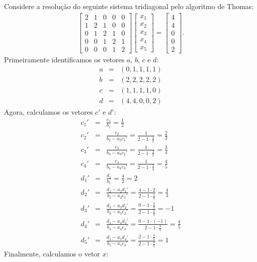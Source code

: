 \begin{ex}\label{linsis:exemplo5_5}
Considere a resolução do seguinte sistema tridiagonal pelo algoritmo de Thomas:
 \begin{eqnarray}\label{linsis:Exemplo5_5} \begin{bmatrix}
   { 2 } & { 1 } & { 0 } & { 0 } & { 0 } \\
   { 1 } & { 2 } & { 1 } & { 0 } & { 0 } \\
   { 0 } & { 1 } & { 2 } & { 1 } & { 0 } \\
   { 0 } & { 0 } & { 1 } & { 2 } & { 1 } \\
   { 0 } & { 0 } & { 0 } & { 1 } & { 2 }
 \end{bmatrix}
\begin{bmatrix}
   {x_1 }  \\
   {x_2 }  \\
   {x_3 }  \\
   {x_4 }  \\
   {x_5 }
\end{bmatrix}
=
\begin{bmatrix}
   {4}  \\
   {4 }  \\
   {0}  \\
   {0}\\
   {2 }
\end{bmatrix}
.
\end{eqnarray}
Primeiramente identificamos os vetores $a$, $b$, $c$ e $d$:
\begin{eqnarray*}
 a &=& (0, 1, 1, 1, 1)\\
 b &=& (2, 2, 2, 2, 2)\\
 c &=& (1, 1, 1, 1, 0)\\
 d &=& (4, 4, 0, 0, 2)
\end{eqnarray*}
Agora, calculamos os vetores $c'$ e $d'$:
\begin{eqnarray*}
 c_1' &=&\frac{c_1}{b_1}=\frac{1}{2}\\
 c_2' &=&\frac{c_2}{b_2-a_2c_1'}=\frac{1}{2-1\cdot \frac{1}{2}}=\frac{2}{3} \\
 c_3' &=&\frac{c_3}{b_3-a_3c_2'}=\frac{1}{2-1\cdot \frac{2}{3}}=\frac{3}{4} \\
 c_4' &=&\frac{c_4}{b_4-a_4c_3'}=\frac{1}{2-1\cdot \frac{3}{4}}=\frac{4}{5} \\
 d_1' &=&\frac{d_1}{b_1}=\frac{4}{2}=2\\
 d_2' &=&\frac{d_2-a_2d_1'}{b_2-a_2c_1'}=\frac{4-1\cdot 2}{2-1\cdot \frac{1}{2}}=\frac{4}{3} \\
 d_3' &=&\frac{d_3-a_3d_2'}{b_3-a_3c_2'}=\frac{0-1\cdot \frac{4}{3}}{2-1\cdot \frac{2}{3}}=-1 \\
 d_4' &=&\frac{d_4-a_4d_3'}{b_4-a_4c_3'}=\frac{0-1\cdot (-1)}{2-1\cdot \frac{3}{4}}=\frac{4}{5} \\
 d_5' &=&\frac{d_5-a_5d_4'}{b_5-a_5c_4'}=\frac{2-1\cdot \frac{4}{5}}{2-1\cdot \frac{4}{5}}=1
\end{eqnarray*}
 Finalmente, calculamos o vetor $x$:


\end{ex}
